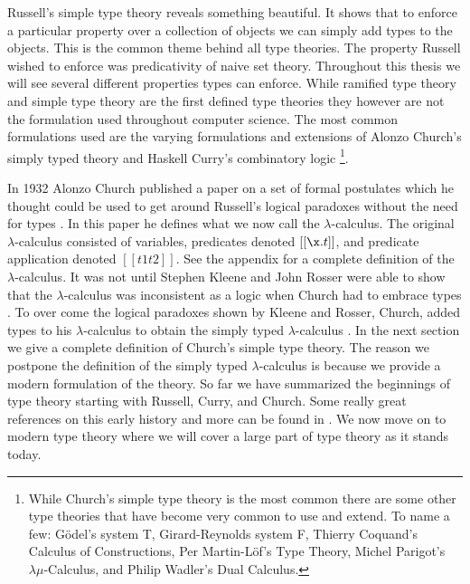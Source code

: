 Russell's simple type theory reveals something beautiful.  It shows
that to enforce a particular property over a collection of objects we
can simply add types to the objects.  This is the common theme behind
all type theories.  The property Russell wished to enforce was
predicativity of naive set theory.  Throughout this thesis we will see
several different properties types can enforce.  While ramified type
theory and simple type theory are the first defined type theories they
however are not the formulation used throughout computer science.  The
most common formulations used are the varying formulations and
extensions of Alonzo Church's simply typed theory and Haskell Curry's
combinatory logic \cite{Church:1940,Cardone:2006} 
\footnote{While Church's simple type theory is the most common there
  are some other type theories that have become very common to use and
  extend.  To name a few: G\"odel's system T, Girard-Reynolds system
  F, Thierry Coquand's Calculus of Constructions,
  Per Martin-L\"of's Type Theory, Michel Parigot's
  $\lambda\mu$-Calculus, and Philip Wadler's Dual Calculus.}.  

In 1932 Alonzo Church published a paper on a set of formal postulates
which he thought could be used to get around Russell's logical
paradoxes without the need for types \cite{Church:1933}.  In this
paper he defines what we now call the
$\lambda$-calculus.  The original
$\lambda$-calculus consisted of variables, predicates denoted
$[[\x.t]]$, and predicate application denoted $[[t1 t2]]$.  See the
appendix for a complete definition of the $\lambda$-calculus.  It was
not until Stephen Kleene and John Rosser were able to show that the
$\lambda$-calculus was inconsistent as a logic when Church had to
embrace types \cite{Kleene:1935}.  To over come the logical paradoxes
shown by Kleene and Rosser, Church, added types to his
$\lambda$-calculus to obtain the simply typed $\lambda$-calculus
\cite{Church:1940,Andrews:2009}.  In the next section we give a
complete definition of Church's simple type theory.  The reason we
postpone the definition of the simply typed $\lambda$-calculus is
because we provide a modern formulation of the theory.  So far we have
summarized the beginnings of type theory starting with Russell, Curry,
and Church.  Some really great references on this early history and
more can be found in
\cite{Cardone:2006,Coquand:2010b,Barendregt:1992}.  We now move on to
modern type theory where we will cover a large part of type theory as
it stands today.

